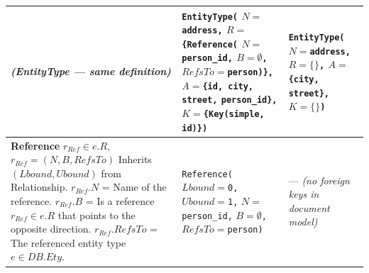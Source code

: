 \begin{longtable}{@{} >{\raggedright}p{5.0cm}
                        >{\raggedright}p{4.0cm}
                        >{\raggedright\arraybackslash}p{4.0cm} @{}}
  \textit{(EntityType --- same definition)}
  &
  \texttt{EntityType(}\newline
  \quad $N{=}$\texttt{address,}\newline
  \quad $R{=}$\texttt{\{Reference(}\newline
  \quad\quad $N{=}$\texttt{person\_id,}\newline
  \quad\quad $B{=}\emptyset$\texttt{,}\newline
  \quad\quad $RefsTo{=}$\texttt{person)\},}\newline
  \quad $A{=}$\texttt{\{id, city, street,}\newline
  \quad\quad\texttt{person\_id\},}\newline
  \quad $K{=}$\texttt{\{Key(simple,}\newline
  \quad\quad\texttt{id)\})}
  &
  \texttt{EntityType(}\newline
  \quad $N{=}$\texttt{address,}\newline
  \quad $R{=}\{\}$\texttt{,}\newline
  \quad $A{=}$\texttt{\{city, street\},}\newline
  \quad $K{=}\{\}$\texttt{)}
  \\
  \midrule

  \textbf{Reference}\newline
  $r_{Ref} \in e.R$,\newline
  $r_{Ref} = (N, B, RefsTo)$\newline
  Inherits $(Lbound, Ubound)$ from\newline
  \quad Relationship.\newline
  $r_{Ref}.N$ = Name of the reference.\newline
  $r_{Ref}.B$ = Is a reference\newline
  \quad $r_{Ref} \in e.R$ that points to the\newline
  \quad opposite direction.\newline
  $r_{Ref}.RefsTo$ = The referenced\newline
  \quad entity type $e \in DB.Ety$.
  &
  \texttt{Reference(}\newline
  \quad $Lbound{=}$\texttt{0,}\newline
  \quad $Ubound{=}$\texttt{1,}\newline
  \quad $N{=}$\texttt{person\_id,}\newline
  \quad $B{=}\emptyset$\texttt{,}\newline
  \quad $RefsTo{=}$\texttt{person)}
  &
  --- \textit{(no foreign keys\newline
  in document model)}
  \\
  \midrule


\end{longtable}
